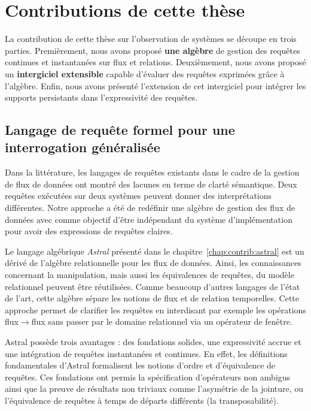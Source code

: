 \section{Contributions de cette thèse}\label{sec:conclusion:contributions}
La contribution de cette thèse sur l'observation de systèmes se découpe en trois parties. Premièrement, nous avons proposé \textbf{une algèbre} de gestion des requêtes continues et instantanées sur flux et relations. Deuxièmement, nous avons proposé un \textbf{intergiciel extensible} capable d'évaluer des requêtes exprimées grâce à l'algèbre. Enfin, nous avons présenté l'extension de cet intergiciel pour intégrer les supports persistants dans l'expressivité des requêtes.

\subsection{Langage de requête formel pour une interrogation généralisée}
Dans la littérature, les langages de requêtes existants dans le cadre de la gestion de flux de données ont montré des lacunes en terme de clarté sémantique. Deux requêtes exécutées sur deux systèmes peuvent donner des interprétations différentes. Notre approche a été de redéfinir une algèbre de gestion des flux de données avec comme objectif d'être indépendant du système d'implémentation pour avoir des expressions de requêtes claires.

Le langage algébrique \textit{Astral} présenté dans le chapitre~\ref{chap:contrib:astral} est un dérivé de l'algèbre relationnelle pour les flux de données. Ainsi, les connaissances concernant la manipulation, mais aussi les équivalences de requêtes, du modèle relationnel peuvent être réutilisées. Comme beaucoup d'autres langages de l'état de l'art, cette algèbre sépare les notions de flux et de relation temporelles. Cette approche permet de clarifier les requêtes en interdisant par exemple les opérations flux$\to$flux sans passer par le domaine relationnel via un opérateur de fenêtre.

Astral possède trois avantages : des fondations solides, une expressivité accrue et une intégration de requêtes instantanées et continues. En effet, les définitions fondamentales d'Astral formalisent les notions d'ordre et d'équivalence de requêtes. Ces fondations ont permis la spécification d'opérateurs non ambigus ainsi que la preuve  de résultats non triviaux comme l'asymétrie de la jointure, ou l'équivalence de requêtes à temps de départs différents (la transposabilité).

